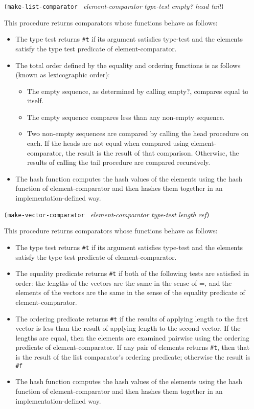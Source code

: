 \texttt{(make-list-comparator\ } \emph{element-comparator}
\emph{type-test empty? head tail}\texttt{)}

This procedure returns comparators whose functions behave as follows:

\begin{itemize}
\item
  The type test returns \texttt{\#t} if its argument satisfies type-test
  and the elements satisfy the type test predicate of
  element-comparator.
\item
  The total order defined by the equality and ordering functions is as
  follows (known as lexicographic order):

  \begin{itemize}
  \tightlist
  \item
    The empty sequence, as determined by calling empty?, compares equal
    to itself.
  \item
    The empty sequence compares less than any non-empty sequence.
  \item
    Two non-empty sequences are compared by calling the head procedure
    on each. If the heads are not equal when compared using
    element-comparator, the result is the result of that comparison.
    Otherwise, the results of calling the tail procedure are compared
    recursively.
  \end{itemize}
\item
  The hash function computes the hash values of the elements using the
  hash function of element-comparator and then hashes them together in
  an implementation-defined way.
\end{itemize}

\texttt{(make-vector-comparator\ } \emph{element-comparator}
\emph{type-test} \emph{length ref}\texttt{)}

This procedure returns comparators whose functions behave as follows:

\begin{itemize}
\item
  The type test returns \texttt{\#t} if its argument satisfies type-test
  and the elements satisfy the type test predicate of
  element-comparator.
\item
  The equality predicate returns \texttt{\#t} if both of the following
  tests are satisfied in order: the lengths of the vectors are the same
  in the sense of =, and the elements of the vectors are the same in the
  sense of the equality predicate of element-comparator.
\item
  The ordering predicate returns \texttt{\#t} if the results of applying
  length to the first vector is less than the result of applying length
  to the second vector. If the lengths are equal, then the elements are
  examined pairwise using the ordering predicate of element-comparator.
  If any pair of elements returns \texttt{\#t}, then that is the result
  of the list comparator's ordering predicate; otherwise the result is
  \texttt{\#f}
\item
  The hash function computes the hash values of the elements using the
  hash function of element-comparator and then hashes them together in
  an implementation-defined way.
\end{itemize}

